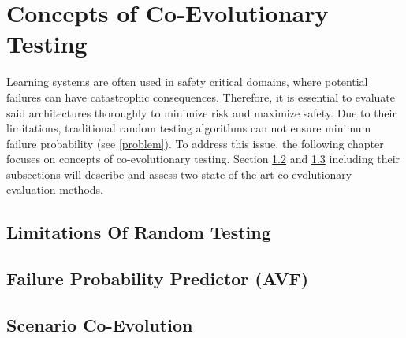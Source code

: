 \section{Concepts of Co-Evolutionary Testing}
\label{testing}
Learning systems are often used in safety critical domains, where potential failures can have catastrophic consequences. Therefore, it is essential to evaluate said architectures thoroughly to minimize risk and maximize safety. Due to their limitations, traditional random testing algorithms can not ensure minimum failure probability (see \ref{problem}). To address this issue, the following chapter focuses on concepts of co-evolutionary testing. Section \ref{avf} and \ref{coevolution} including their subsections will describe and assess two state of the art co-evolutionary evaluation methods.


\subsection{Limitations Of Random Testing}
\label{limitations}



\subsection{Failure Probability Predictor (AVF)}
\label{avf}



\subsection{Scenario Co-Evolution}
\label{coevolution}
